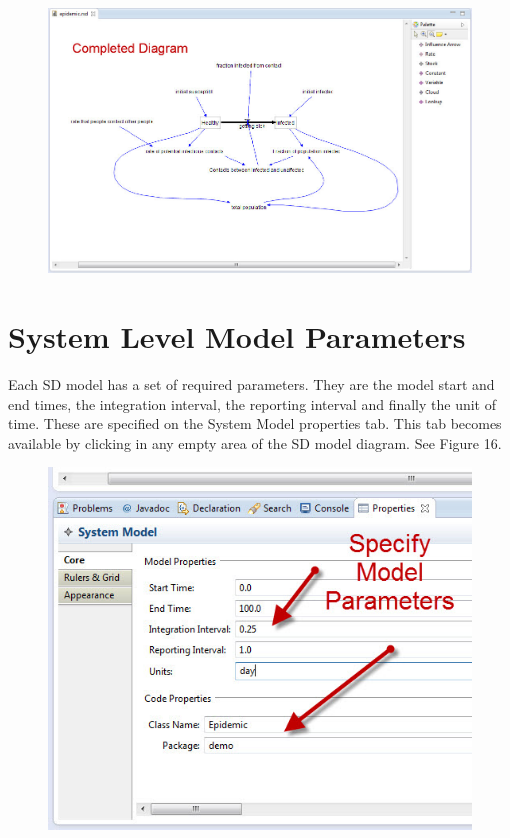 \documentclass[11pt]{amsart}
\begin{document}
\begin{figure}[ht]
\begin{center}
\vspace{.2in}
\centerline {
\includegraphics[totalheight=0.3\textheight]{images/015.jpg}
}
\caption{}
\label{fig:015}
\end{center}
\end{figure}

\clearpage

\section{System Level Model Parameters}
Each SD model has a set of required parameters. They are the model start and end times, the integration interval, the reporting interval and finally the unit of time. These are specified on the System Model properties tab. This tab becomes available by clicking in any empty area of the SD model diagram. See Figure 16.





\begin{figure}[ht]
\begin{center}
\vspace{.2in}
\centerline {
\includegraphics[totalheight=0.4\textheight]{images/016.jpg}
}
\caption{}
\label{fig:016}
\end{center}
\end{figure}
\end{document}
